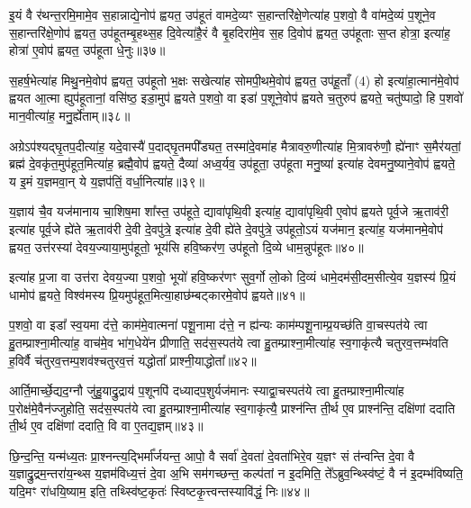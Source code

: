 इ॒यं वै र॑थन्त॒रमि॒मामे॒व स॒हान्नाद्ये॒नोप॑ ह्वयत॒ उप॑हूतं वामदे॒व्यꣳ स॒हान्तरि॑क्षे॒णेत्या॑ह प॒शवो॒ वै वा॑मदे॒व्यं प॒शूने॒व स॒हान्तरि॑क्षे॒णोप॑ ह्वयत॒ उप॑हूतम्बृ॒हथ्स॒ह दि॒वेत्या॑है॒रं वै बृ॒हदिरा॑मे॒व स॒ह दि॒वोप॑ ह्वयत॒ उप॑हूताः स॒प्त होत्रा॒ इत्या॑ह॒ होत्रा॑ ए॒वोप॑ ह्वयत॒ उप॑हूता धे॒नुः॥३७॥

स॒हर्\mbox{}ष॒भेत्या॑ह मिथु॒नमे॒वोप॑ ह्वयत॒ उप॑हूतो भ॒क्षः सखेत्या॑ह सोमपी॒थमे॒वोप॑ ह्वयत॒ उप॑हू॒ताँ (4) हो इत्या॑हा॒त्मान॑मे॒वोप॑ ह्वयत आ॒त्मा ह्युप॑हूतानां॒ वसि॑ष्ठ॒ इडा॒मुप॑ ह्वयते प॒शवो॒ वा इडा॑ प॒शूने॒वोप॑ ह्वयते च॒तुरुप॑ ह्वयते॒ चतु॑ष्पादो॒ हि प॒शवो॑ मान॒वीत्या॑ह॒ मनु॒र्\mbox{}ह्ये॑ताम्॥३८॥

अग्रे\-ऽप॑श्यद्घृ॒तप॒दीत्या॑ह॒ यदे॒वास्यै॑ प॒दाद्घृ॒तमपी᳚ड्यत॒ तस्मा॑दे॒वमा॑ह मैत्रावरु॒णीत्या॑ह मि॒त्रावरु॑णौ॒ ह्ये॑नाꣳ स॒मैर॑यतां॒ ब्रह्म॑ दे॒वकृ॑त॒मुप॑हूत॒मित्या॑ह॒ ब्रह्मै॒वोप॑ ह्वयते॒ दैव्या॑ अध्व॒र्यव॒ उप॑हूता॒ उप॑हूता मनु॒ष्या॑ इत्या॑ह देवमनु॒ष्याने॒वोप॑ ह्वयते॒ य इ॒मं य॒ज्ञमवा॒न् ये य॒ज्ञप॑तिं॒ वर्धा॒नित्या॑ह॥३९॥

य॒ज्ञाय॑ चै॒व यज॑मानाय चा॒शिष॒मा शा᳚स्त॒ उप॑हूते॒ द्यावा॑पृथि॒वी इत्या॑ह॒ द्यावा॑पृथि॒वी ए॒वोप॑ ह्वयते पूर्व॒जे ऋ॒ताव॑री॒ इत्या॑ह पूर्व॒जे ह्ये॑ते ऋ॒ताव॑री दे॒वी दे॒वपु॑त्रे॒ इत्या॑ह दे॒वी ह्ये॑ते दे॒वपु॑त्रे॒ उप॑हूतो॒\-ऽयं यज॑मान॒ इत्या॑ह॒ यज॑मानमे॒वोप॑ ह्वयत॒ उत्त॑रस्यां देवय॒ज्याया॒मुप॑हूतो॒ भूय॑सि हवि॒ष्कर॑ण॒ उप॑हूतो दि॒व्ये धाम॒न्नुप॑हूतः॥४०॥

इत्या॑ह प्र॒जा वा उत्त॑रा देवय॒ज्या प॒शवो॒ भूयो॑ हवि॒ष्कर॑णꣳ सुव॒र्गो लो॒को दि॒व्यं धामे॒दम॑सी॒दम॒सीत्ये॒व य॒ज्ञस्य॑ प्रि॒यं धामोप॑ ह्वयते॒ विश्व॑मस्य प्रि॒यमुप॑हूत॒मित्या॒हाछ॑म्बट्कारमे॒वोप॑ ह्वयते॥४१॥

{\anuvakamend[{आ॒ह॒ धे॒नुरे॒तां वर्धा॒नित्या॑ह॒ धाम॒न्नुप॑हूत॒श्चतु॑स्त्रिꣳशच्च॥७॥}]}

प॒शवो॒ वा इडा᳚ स्व॒यमा द॑त्ते॒ काम॑मे॒वात्मना॑ पशू॒नामा द॑त्ते॒ न ह्य॑न्यः काम॑म्पशू॒नाम्प्र॒यच्छ॑ति वा॒चस्पत॑ये त्वा हु॒तम्प्राश्ना॒मीत्या॑ह॒ वाच॑मे॒व भा॑ग॒धेये॑न प्रीणाति॒ सद॑स॒स्पत॑ये त्वा हु॒तम्प्राश्ना॒मीत्या॑ह स्व॒गाकृ॑त्यै चतुरव॒त्तम्भ॑वति ह॒विर्वै च॑तुरव॒त्तम्प॒शव॑श्चतुरव॒त्तं यद्धोता᳚ प्राश्नी॒याद्धोता᳚॥४२॥

आर्ति॒मार्च्छे॒द्यद॒ग्नौ जु॑हु॒याद्रु॒द्राय॑ प॒शूनपि॑ दध्यादप॒शुर्यज॑मानः स्याद्वा॒चस्पत॑ये त्वा हु॒तम्प्राश्ना॒मीत्या॑ह प॒रोक्ष॑मे॒वैन॑ज्जुहोति॒ सद॑स॒स्पत॑ये त्वा हु॒तम्प्राश्ना॒मीत्या॑ह स्व॒गाकृ॑त्यै॒ प्राश्न॑न्ति ती॒र्थ ए॒व प्राश्न॑न्ति॒ दक्षि॑णां ददाति ती॒र्थ ए॒व दक्षि॑णां ददाति॒ वि वा ए॒तद्य॒ज्ञम्॥४३॥

छि॒न्द॒न्ति॒ यन्म॑ध्य॒तः प्रा॒श्नन्त्य॒द्भिर्मा᳚र्जयन्त॒ आपो॒ वै सर्वा॑ दे॒वता॑ दे॒वता॑भिरे॒व य॒ज्ञꣳ सं त॑न्वन्ति दे॒वा वै य॒ज्ञाद्रु॒द्रम॒न्तरा॑य॒न्थ्स य॒ज्ञम॑विध्य॒त्तं दे॒वा अ॒भि सम॑गच्छन्त॒ कल्प॑तां न इ॒दमिति॒ ते᳚\-ऽब्रुव॒न्थ्स्वि॑ष्टं॒ वै न॑ इ॒दम्भ॑विष्यति॒ यदि॒मꣳ रा॑धयि॒ष्याम॒ इति॒ तथ्स्वि॑ष्ट॒कृतः॑ स्विष्टकृ॒त्त्वन्तस्यावि॑द्धं॒ निः॥४४॥

